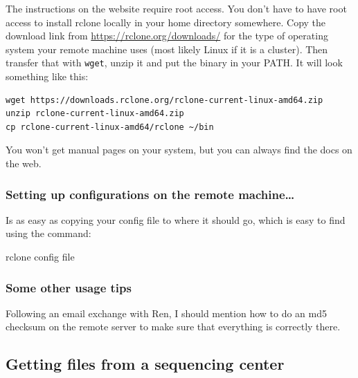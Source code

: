 \documentclass[]{krantz}
\makeatletter
\newenvironment{Shaded}{\begin{snugshade}}{\end{snugshade}}
\newcommand{\ExtensionTok}[1]{#1}
\newcommand{\NormalTok}[1]{#1}
\newenvironment{kframe}{%
\medskip{}
\setlength{\fboxsep}{.8em}
 \def\at@end@of@kframe{}%
 \ifinner\ifhmode%
  \def\at@end@of@kframe{\end{minipage}}%
  \begin{minipage}{\columnwidth}%
 \fi\fi%
 \def\FrameCommand##1{\hskip\@totalleftmargin \hskip-\fboxsep
 \colorbox{shadecolor}{##1}\hskip-\fboxsep
     \hskip-\linewidth \hskip-\@totalleftmargin \hskip\columnwidth}%
 \MakeFramed {\advance\hsize-\width
   \@totalleftmargin\z@ \linewidth\hsize
   \@setminipage}}%
 {\par\unskip\endMakeFramed%
 \at@end@of@kframe}
\renewenvironment{Shaded}{\begin{kframe}}{\end{kframe}}
\makeatother
\begin{document}
The instructions on the website require root access. You don't have to have root
access to install rclone locally in your home directory somewhere.
Copy the download link from \url{https://rclone.org/downloads/} for
the type of operating system your remote machine uses (most likely Linux if it is a cluster).
Then transfer that with \texttt{wget}, unzip it and put the binary in your PATH. It will look
something like this:

\begin{verbatim}
wget https://downloads.rclone.org/rclone-current-linux-amd64.zip
unzip rclone-current-linux-amd64.zip
cp rclone-current-linux-amd64/rclone ~/bin
\end{verbatim}

You won't get manual pages on your system, but you can always find the docs on the web.

\hypertarget{setting-up-configurations-on-the-remote-machine}{%
\subsubsection{Setting up configurations on the remote machine\ldots{}}\label{setting-up-configurations-on-the-remote-machine}}

Is as easy as copying your config file to where it should go, which
is easy to find using the command:

\begin{Shaded}
\begin{Highlighting}[]
\ExtensionTok{rclone}\NormalTok{ config file}
\end{Highlighting}
\end{Shaded}

\hypertarget{some-other-usage-tips}{%
\subsubsection{Some other usage tips}\label{some-other-usage-tips}}

Following an email exchange with Ren, I should mention how to do an md5
checksum on the remote server to make sure that everything is correctly there.

\hypertarget{getting-files-from-a-sequencing-center}{%
\subsection{Getting files from a sequencing center}\label{getting-files-from-a-sequencing-center}}
\end{document}
